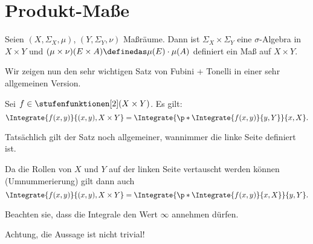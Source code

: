 \section{Produkt-Maße}
Seien \( (X,\Sigma_X,\mu) \), \( (Y,\Sigma_Y,\nu) \) Maßräume. Dann ist \( \Sigma_X \times \Sigma_Y \) eine \( \sigma \)-Algebra in \( X\times Y \) und \( (\mu\times \nu)(E\times A)\definedas \mu(E)\cdot \mu(A) \) definiert ein Maß auf \( X\times Y \).

Wir zeigen nun den sehr wichtigen Satz von Fubini + Tonelli in einer sehr allgemeinen Version.
\begin{satz}[Fubini]\label{fubini}
  Sei \( f\in \stufenfunktionen[2](X\times Y) \). Es gilt:
  \begin{equation*}
    \Integrate{f(x,y)}{{(x,y)},{X\times Y}}=\Integrate{\p*{\Integrate{f(x,y)}{y,Y}}}{x,X}.
  \end{equation*}
\end{satz}
\begin{bemerkung*}
  Tatsächlich gilt der Satz noch allgemeiner, wannimmer die linke Seite definiert ist.
\end{bemerkung*}
\begin{bemerkung*}
  Da die Rollen von \( X \) und \( Y \) auf der linken Seite vertauscht werden können (Umnummerierung) gilt dann auch
  \begin{equation*}
    \Integrate{f(x,y)}{{(x,y)},{X\times Y}}=\Integrate{\p*{\Integrate{f(x,y)}{x,X}}}{y,Y}.
  \end{equation*}
\end{bemerkung*}
\begin{bemerkung*}
  Beachten sie, dass die Integrale den Wert \( \infty \) annehmen dürfen.
\end{bemerkung*}
Achtung, die Aussage ist nicht trivial!
